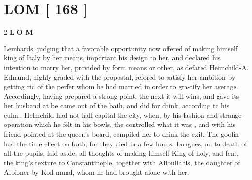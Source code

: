\documentclass[10pt]{article}
\begin{document}
\section*{\centering \textbf{LOM [ 168 ]}}
\begin{multicols}{2}\raggedcolumns
\textbf{L O M}

Lembards, judging that a favorable opportunity now offered of making himself king of Italy by her means, important his design to her, and declared his intention to marry her, provided by form means or other, as defated Heimchild-A. Edmund, highly graded with the propostal, refored to satisfy her ambition by getting rid of the perfer whom he had married in order to gra-tify her average. Accordingly, having prepared a strong point, the next it will wins, and gave its her husband at be came out of the bath, and did for drink, according to his culm.. Helmchild had not half capital the city, when, by his fashion and strange operation which he felt in his bowls, the controlled what it was , and with his friend pointed at the queen’s board, compiled her to drink the exit. The goofin had the time effect on both; for they died in a few hours. Longues, on to death of all the pupils, laid aside, all thoughts of making himself King of holy, and fent, the king’s texture to Constantinople, together with Alibullahis, the daughter of Albioner by Kod-mund, whom he had brought alone with her.


\end{multicols}
\end{document}
